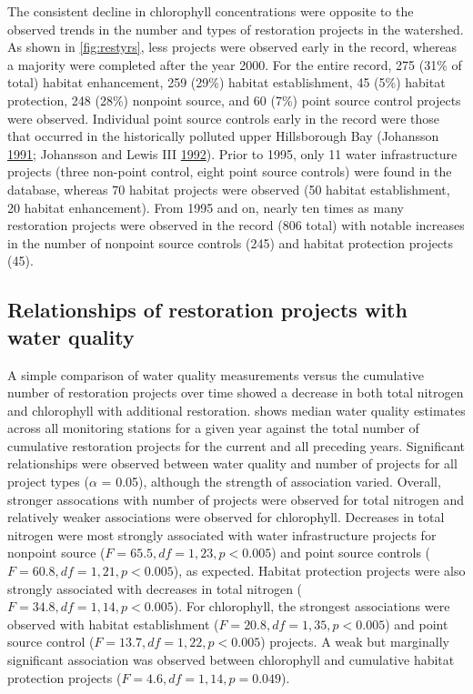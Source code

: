 \documentclass[]{article}
\begin{document}
The consistent decline in chlorophyll concentrations were opposite to
the observed trends in the number and types of restoration projects in
the watershed. As shown in \cref{fig:restyrs}, less projects were
observed early in the record, whereas a majority were completed after
the year 2000. For the entire record, 275 (31\% of total) habitat
enhancement, 259 (29\%) habitat establishment, 45 (5\%) habitat
protection, 248 (28\%) nonpoint source, and 60 (7\%) point source
control projects were observed. Individual point source controls early
in the record were those that occurred in the historically polluted
upper Hillsborough Bay (Johansson
\protect\hyperlink{ref-Johansson91}{1991}; Johansson and Lewis III
\protect\hyperlink{ref-Johansson92}{1992}). Prior to 1995, only 11 water
infrastructure projects (three non-point control, eight point source
controls) were found in the database, whereas 70 habitat projects were
observed (50 habitat establishment, 20 habitat enhancement). From 1995
and on, nearly ten times as many restoration projects were observed in
the record (806 total) with notable increases in the number of nonpoint
source controls (245) and habitat protection projects (45).

\hypertarget{relationships-of-restoration-projects-with-water-quality}{%
\subsection{Relationships of restoration projects with water
quality}\label{relationships-of-restoration-projects-with-water-quality}}

A simple comparison of water quality measurements versus the cumulative
number of restoration projects over time showed a decrease in both total
nitrogen and chlorophyll with additional restoration. 
shows median water quality estimates across all monitoring stations for
a given year against the total number of cumulative restoration projects
for the current and all preceding years. Significant relationships were
observed between water quality and number of projects for all project
types (\(\alpha\) = 0.05), although the strength of association varied.
Overall, stronger assocations with number of projects were observed for
total nitrogen and relatively weaker associations were observed for
chlorophyll. Decreases in total nitrogen were most strongly associated
with water infrastructure projects for nonpoint source
(\(F=65.5, df = 1, 23, p < 0.005\)) and point source controls
(\(F=60.8, df = 1, 21, p < 0.005\)), as expected. Habitat protection
projects were also strongly associated with decreases in total nitrogen
(\(F=34.8, df = 1, 14, p < 0.005\)). For chlorophyll, the strongest
associations were observed with habitat establishment
(\(F=20.8, df = 1, 35, p< 0.005\)) and point source control
(\(F=13.7, df = 1, 22, p < 0.005\)) projects. A weak but marginally
significant association was observed between chlorophyll and cumulative
habitat protection projects (\(F=4.6, df = 1, 14, p = 0.049\)).
\end{document}
